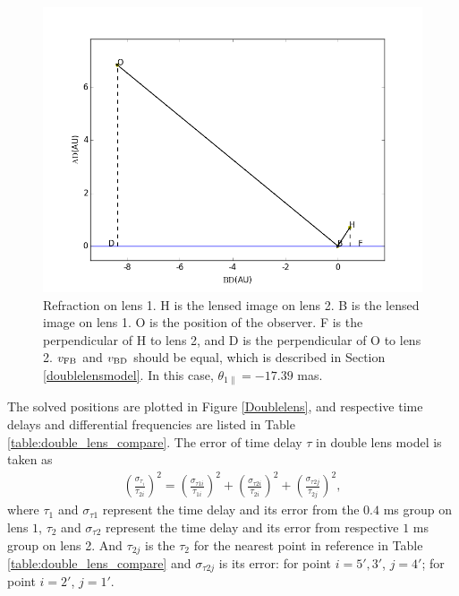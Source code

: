 \documentclass[useAMS,usenatbib]{mn2e}
\begin{document}
\begin{figure}
\centering
\includegraphics[width=1.0\linewidth]{Second_reflection.png}
\caption{Refraction on lens 1. 
H is the lensed image on lens 2. B is the lensed image on lens 1. O is the position of the observer. F is the perpendicular of H to lens 2, and D is the perpendicular of O to lens 2. $v_{\rm FB}$ and $v_{\rm BD}$ should be equal, which is described in Section \ref{doublelensmodel}. In this case, $\theta_{1\parallel} = -17.39$ mas. }
\label{second_reflect}
\end{figure}



The solved positions are plotted in Figure \ref{Doublelens}, and
respective time delays and differential frequencies are listed in
Table \ref{table:double_lens_compare}. The error of time delay $\tau$
in double lens model is taken as
\begin{equation}
\begin{aligned}
(\frac{\sigma_{\tau_i}}{\tau_{2i}})^2 = (\frac{\sigma_{\tau1i}}{\tau_{1i}})^2+(\frac{\sigma_{\tau2i}}{\tau_{2i}})^2 + (\frac{\sigma_{\tau2j}}{\tau_{2j}})^2,
\end{aligned}
\end{equation}
where $\tau_1$ and $\sigma_{\tau1}$ represent the time delay and its
error from the $0.4$ ms group on lens $1$, $\tau_2$ and
$\sigma_{\tau2}$ represent the time delay and its error from
respective $1$ ms group on lens 2. And $\tau_{2j}$ is the $\tau_2$ for
the nearest point in reference in Table
\ref{table:double_lens_compare} and $\sigma_{\tau2j}$ is its error:
for point $i=5',3'$, $j=4'$; for point $i=2'$, $j=1'$.
\end{document}
